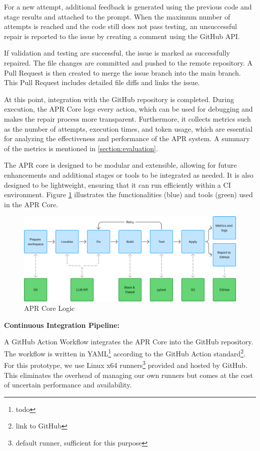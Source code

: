 For a new attempt, additional feedback is generated using the previous code and stage results and attached to the prompt. When the maximum number of attempts is reached and the code still does not pass testing, an unsuccessful repair is reported to the issue by creating a comment using the GitHub API.

If validation and testing are successful, the issue is marked as successfully repaired. The file changes are committed and pushed to the remote repository. A Pull Request is then created to merge the issue branch into the main branch. This Pull Request includes detailed file diffs and links the issue.

At this point, integration with the GitHub repository is completed. During execution, the APR Core logs every action, which can be used for debugging and makes the repair process more transparent. Furthermore, it collects metrics such as the number of attempts, execution times, and token usage, which are essential for analyzing the effectiveness and performance of the APR system. A summary of the metrics is mentioned in \ref{section:evaluation}.

The APR core is designed to be modular and extensible, allowing for future enhancements and additional stages or tools to be integrated as needed. It is also designed to be lightweight, ensuring that it can run efficiently within a CI environment. Figure \ref{fig:apr-core} illustrates the functionalities (blue) and tools (green) used in the APR Core.

\begin{figure}[H]
    \centering
    \includegraphics[width=1\textwidth]{images/flowcharts/apr_core.png}
    \caption{APR Core Logic}
    \label{fig:apr-core}
\end{figure}

\textbf{Continuous Integration Pipeline:}

A GitHub Action Workflow integrates the APR Core into the GitHub repository. The workflow is written in YAML\footnote{todo} according to the GitHub Action standard\footnote{link to GitHub}. For this prototype, we use Linux x64 runners\footnote{default runner, sufficient for this purpose} provided and hosted by GitHub. This eliminates the overhead of managing our own runners but comes at the cost of uncertain performance and availability. %


